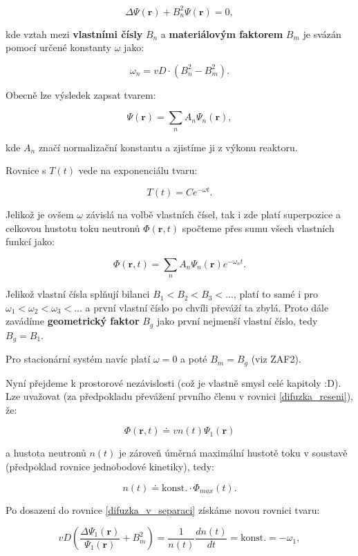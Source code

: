 $$ \Delta \Psi (\textbf{r}) + B_n^2 \Psi (\textbf{r}) = 0, $$

kde vztah mezi \textbf{vlastními čísly} $B_n$ a \textbf{materiálovým faktorem} $B_m$ je svázán pomocí určené konstanty $\omega$ jako:

$$ \omega_n = vD \cdot (B_n^2-B_m^2). $$

Obecně lze výsledek zapsat tvarem:

$$ \Psi (\textbf{r}) = \sum_n A_n \Psi_n (\textbf{r}), $$

kde $A_n$ značí normalizační konstantu a zjistíme ji z výkonu reaktoru.

Rovnice s $T(t)$ vede na exponenciálu tvaru:

$$ T(t) = C e^{- \omega t}. $$

Jelikož je ovšem $\omega$ závislá na volbě vlastních čísel, tak i zde platí superpozice a celkovou hustotu toku neutronů $\Phi (\textbf{r}, t)$ spočteme přes sumu všech vlastních funkcí jako:

\begin{equation}
  \Phi (\textbf{r}, t) = \sum_n A_n \Psi_n (\textbf{r}) e^{- \omega_n t}.
  \label{difuzka_reseni}
\end{equation}

Jelikož vlastní čísla splňují bilanci $B_1 < B_2 < B_3 < ...$, platí to samé i pro $\omega_1 < \omega_2 < \omega_3 < ...$ a první vlastní číslo po chvíli převáží ta zbylá. Proto dále zavádíme \textbf{geometrický faktor} $B_g$ jako první nejmenší vlastní číslo, tedy $B_g = B_1$.

Pro stacionární systém navíc platí $\omega = 0$ a poté $B_m = B_g$ (viz ZAF2).

Nyní přejdeme k prostorové nezávislosti (což je vlastně smysl celé kapitoly :D). Lze uvažovat (za předpokladu převážení prvního členu v rovnici \eqref{difuzka_reseni}), že:

$$ \Phi (\textbf{r}, t) \doteq v n(t) \Psi_1 (\textbf{r}) $$

a hustota neutronů $n(t)$ je zároveň úměrná maximální hustotě toku v soustavě (předpoklad rovnice jednobodové kinetiky), tedy:

$$ n(t) \doteq \text{konst.} \cdot \Phi_{max} (t). $$

Po dosazení do rovnice \eqref{difuzka_v_separaci} získáme novou rovnici tvaru:

\begin{equation}
  v D \left ( \dfrac{\Delta \Psi_1 (\textbf{r})}{\Psi_1 (\textbf{r})} + B_m^2 \right ) = \dfrac{1}{n(t)} \dfrac{d n(t)}{d t} = \text{konst.} = - \omega_1,
  \label{rovnice_kinetiky_v_separaci}
\end{equation}

